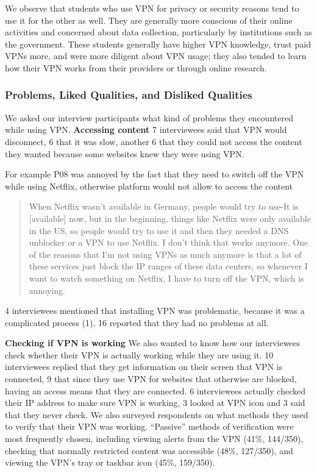 We observe that students who use VPN for privacy or security reasons tend to
use it for the other as well. They are generally more conscious of their
online activities and concerned about data collection, particularly by
institutions such as the government. These students generally have higher VPN
knowledge, trust paid VPNs more, and were more diligent about VPN usage; they
also tended to learn how their VPN works from their providers or through
online research.


\subsubsection{Problems, Liked Qualities, and Disliked Qualities} We asked our
interview participants what kind of problems they encountered while using VPN.
\textbf{Accessing content} 7 interviewees said that VPN would disconnect, 6
that it was slow, another 6 that they could not access the content they wanted
because some websites knew they were using VPN. 


For example P08 was annoyed by the fact that they need to switch off the VPN
while using Netflix, otherwise platform would not allow to access the content

\begin{quote}When Netflix wasn't available in Germany, people would try to use-It is [available] now, but in the beginning, things like Netflix were
only available in the US, so people would try to use it and then they needed a
DNS unblocker or a VPN to use Netflix. I don't think that works anymore. One
of the reasons that I'm not using VPNs as much anymore is that a lot of these
services just block the IP ranges of these data centers, so whenever I want to
watch something on Netflix, I have to turn off the VPN, which is annoying.
\end{quote}


4 interviewees mentioned that installing VPN was problematic, because it was a
complicated process (1). 16 reported that they had no problems at all. 

\textbf{Checking if VPN is working} We also wanted to know how our
interviewees check whether their VPN is actually working while they are using
it. 10 interviewees replied that they get information on their screen that VPN
is connected, 9 that since they use VPN for websites that otherwise are
blocked, having an access means that they are connected. 6 interviewees
actually checked their IP address to make sure VPN is working, 3 looked at VPN
icon and 3 said that they never check. 
We also surveyed respondents on what methods they used to verify that their
VPN was working. “Passive” methods of verification were most frequently
chosen, including viewing alerts from the VPN (41\%, 144/350), checking that
normally restricted content was accessible (48\%, 127/350), and viewing the
VPN’s tray or taskbar icon (45\%, 159/350).

